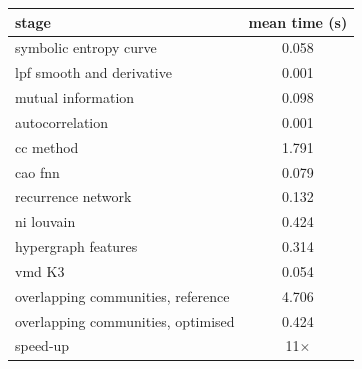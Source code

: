 \begin{tabular}{lc}
\toprule
stage & mean time (s) \\
\midrule
symbolic entropy curve & 0.058 \\
lpf smooth and derivative & 0.001 \\
mutual information & 0.098 \\
autocorrelation & 0.001 \\
cc method & 1.791 \\
cao fnn & 0.079 \\
recurrence network & 0.132 \\
ni louvain & 0.424 \\
hypergraph features & 0.314 \\
vmd K3 & 0.054 \\
\midrule
overlapping communities, reference & 4.706 \\
overlapping communities, optimised & 0.424 \\
speed-up & 11$\times$ \\
\bottomrule
\end{tabular}
